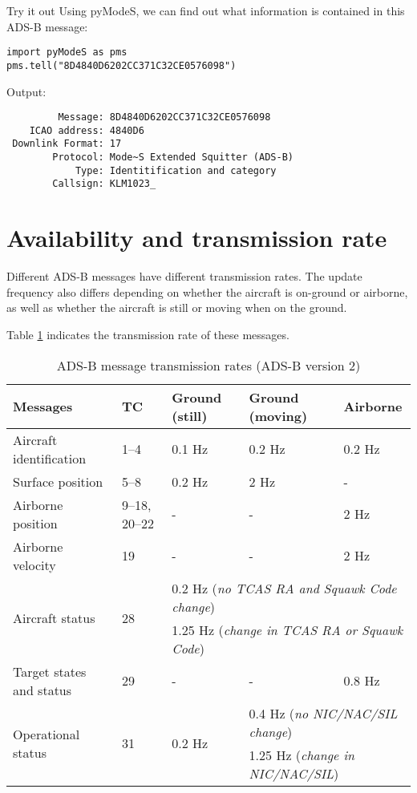 \begin{notebox}{Try it out}
  Using pyModeS, we can find out what information is contained in this ADS-B message:

\begin{verbatim}
import pyModeS as pms
pms.tell("8D4840D6202CC371C32CE0576098")
\end{verbatim}

Output:

\begin{verbatim}
         Message: 8D4840D6202CC371C32CE0576098 
    ICAO address: 4840D6 
 Downlink Format: 17 
        Protocol: Mode~S Extended Squitter (ADS-B) 
            Type: Identitification and category 
        Callsign: KLM1023_ 
\end{verbatim}
  

\end{notebox}


\section{Availability and transmission rate}

Different ADS-B messages have different transmission rates. The update frequency also differs depending on whether the aircraft is on-ground or airborne, as well as whether the aircraft is still or moving when on the ground.

Table \ref{tb:adsb-transmission-rate} indicates the transmission rate of these messages.

\begin{table}[ht]
  \footnotesize
  \centering
  \caption{ADS-B message transmission rates (ADS-B version 2)}
  \label{tb:adsb-transmission-rate}
  \begin{tabular}{|l|l|l|l|l|}
  \hline
  \textbf{Messages} & \textbf{TC} & \textbf{Ground (still)} & \textbf{Ground (moving)} & \textbf{Airborne} \\ \hline
  Aircraft identification & 1--4 & 0.1 Hz & 0.2 Hz & 0.2 Hz \\ \hline
  Surface position & 5--8 & 0.2 Hz & 2 Hz & - \\ \hline
  Airborne position & 9--18, 20--22 & - & - & 2 Hz \\ \hline
  Airborne velocity & 19 & - & - & 2 Hz \\ \hline
  \multirow{2}{*}{Aircraft status} & \multirow{2}{*}{28} & \multicolumn{3}{l|}{0.2 Hz (\textit{no TCAS RA and Squawk Code change})} \\ \cline{3-5} 
   &  & \multicolumn{3}{l|}{1.25 Hz (\textit{change in TCAS RA or Squawk Code})} \\ \hline
  Target states and status & 29 & - & - & 0.8 Hz \\ \hline
  \multirow{2}{*}{Operational status} & \multirow{2}{*}{31} & \multirow{2}{*}{0.2 Hz} & \multicolumn{2}{l|}{0.4 Hz (\textit{no NIC/NAC/SIL change})} \\ \cline{4-5} 
   &  &  & \multicolumn{2}{l|}{1.25 Hz (\textit{change in NIC/NAC/SIL})} \\ \hline
  \end{tabular}
\end{table}

